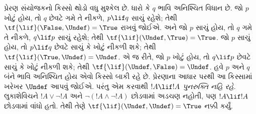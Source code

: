\documentclass[../../../include/open-logic-section]{subfiles}
\begin{document}
પ્રેરણ સંયોજકનો કિસ્સો થોડો વધુ મુશ્કેલ છે. ધારો કે $q$ ભાવિ
અનિશ્ચિત વિધાન છે. જો $p$ ખોટું હોય, તો $q$ છેવટે ગમે તે નીકળે,
$p \lif q$ સાચું રહેશે; તેથી $\tf{\lif}(\False, \Undef) = \True$
રાખવું જોઈએ. અને જો $p$ સાચું હોય, તો $q$ ગમે તે નીકળે,
$q \lif p$ સાચું રહેશે; તેથી $\tf{\lif}(\Undef, \True) = \True$.
જો $p$ સાચું હોય, તો $p \lif q$ છેવટે સાચું કે ખોટું નીકળી શકે;
તેથી $\tf{\lif}(\True, \Undef) = \Undef$. એ જ રીતે, જો $p$
ખોટું હોય, તો $q \lif p$ છેવટે સાચું કે ખોટું નીકળી શકે; તેથી
$\tf{\lif}(\Undef, \False) = \Undef$. હવે $p$ અને $q$ બંને
ભાવિ અનિશ્ચિત હોય એવો કિસ્સો બાકી રહે છે. પ્રેરણાના આધાર પરથી
આ કિસ્સામાં ખરેખર $\Undef$ આપવું જોઈએ. પરંતુ એમ કરવાથી
$!A \lif !A$ \emph{પુનરુક્તિ નહિ રહે}. લુકાશેવિચને
$!A \lor \lnot !A$ અને $\lnot(!A \land \lnot !A)$ છોડવામાં
અડચણ નહોતી, પણ $!A \lif !A$ છોડવામાં વાંધો હતો. તેથી તેણે
$\tf{\lif}(\Undef, \Undef) = \True$ નક્કી કર્યું.
\end{document}
